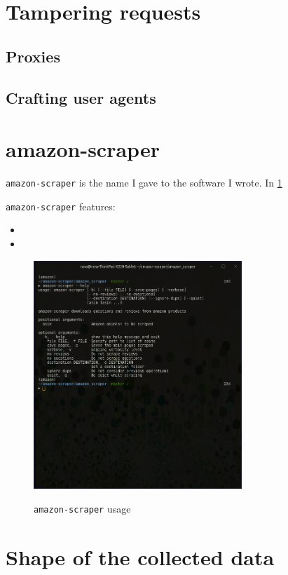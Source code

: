 \documentclass[LaM,binding=0.6cm]{sapthesis}
\begin{document}
\section{Tampering requests}

\subsection{Proxies}
\subsection{Crafting user agents}


\section{amazon-scraper}
\texttt{amazon-scraper} is the name I gave to the software I wrote. In \ref{fig:amazon-scraper}

\texttt{amazon-scraper} features:
\begin{itemize}
	\item 
	\item
\end{itemize}

\begin{figure}
\centering
\includegraphics[width=0.7\textwidth]{pictures/1.png}\\[3ex]
\caption{\texttt{amazon-scraper} usage}
\label{fig:amazon-scraper}
\end{figure}

\section{Shape of the collected data}
\end{document}
